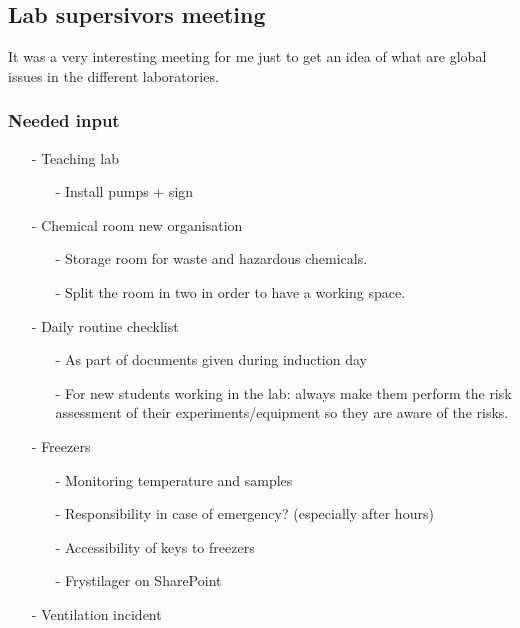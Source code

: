 \subsection{Lab supersivors meeting}
\label{task:20180320_cj1}

It was a very interesting meeting for me just to get an idea of what are global issues in the different laboratories.

\subsubsection{Needed input}
\begin{enumerate}
    \item[-] Teaching lab
    \begin{itemize}
        \item[-] Install pumps + sign
    \end{itemize}
    
    \item[-] Chemical room new organisation
    \begin{itemize}
        \item[-] Storage room for waste and hazardous chemicals.
        \item[-] Split the room in two in order to have a working space.
    \end{itemize}
    \item[-] Daily routine checklist
    \begin{itemize}
        \item[-] As part of documents given during induction day
        \item[-] For new students working in the lab: always make them perform the risk assessment of their experiments/equipment so they are aware of the risks.
    \end{itemize}
    \item[-] Freezers
    \begin{itemize}
        \item[-] Monitoring temperature and samples 
        \item[-] Responsibility in case of emergency? (especially after hours)
        \item[-] Accessibility of keys to freezers
        \item[-] Frystilager on SharePoint
    \end{itemize}
    \item[-] Ventilation incident 
\end{enumerate}

